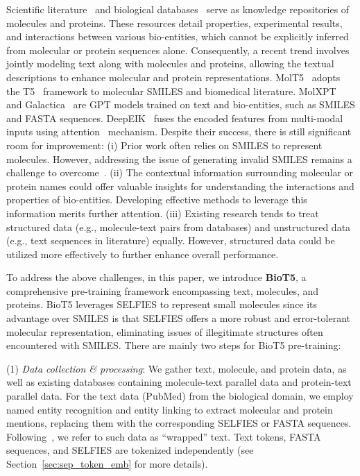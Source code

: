 \documentclass[11pt]{article}
\newcommand{\method}{{BioT5}}
\begin{document}
Scientific literature~\citep{DBLP:conf/emnlp/BeltagyLC19,canese2013pubmed} and biological databases~\citep{kim2023pubchem,boutet2007uniprotkb} serve as knowledge repositories of molecules and proteins.
These resources detail properties, experimental results, and interactions between various bio-entities, which cannot be explicitly inferred from molecular or protein sequences alone.
Consequently, a recent trend involves jointly modeling text along with molecules and proteins, allowing the textual descriptions to enhance molecular and protein representations. 
MolT5~\citep{DBLP:conf/emnlp/EdwardsLRHCJ22} adopts the T5~\citep{raffel2020exploring} framework to molecular SMILES and biomedical literature. 
MolXPT~\citep{liu2023molxpt} and Galactica~\citep{taylor2022galactica} are GPT models trained on text and bio-entities, such as SMILES and FASTA sequences.
DeepEIK~\citep{luo2023empowering} fuses the encoded features from multi-modal inputs using attention~\citep{vaswani2017attention} mechanism.
Despite their success, there is still significant room for improvement: (i) Prior work often relies on SMILES to represent molecules. However, addressing the issue of generating invalid SMILES remains a challenge to overcome~\citep{DBLP:conf/emnlp/EdwardsLRHCJ22,li2023empowering}.
(ii) The contextual information surrounding molecular or protein names could offer valuable insights for understanding the interactions and properties of bio-entities. Developing effective methods to leverage this information merits further attention. 
(iii) Existing research tends to treat structured data (e.g., molecule-text pairs from databases) and unstructured data (e.g., text sequences in literature) equally. However, structured data could be utilized more effectively to further enhance overall performance.

To address the above challenges, in this paper, we introduce \textbf{\method}, a comprehensive pre-training framework encompassing text, molecules, and proteins. \method{} leverages SELFIES \cite{krenn2020self}  to represent small molecules since its advantage over SMILES is that SELFIES offers a more robust and error-tolerant molecular representation, eliminating issues of illegitimate structures often encountered with SMILES. There are mainly two steps for \method{} pre-training:

(1) {\em Data collection \& processing}: We gather text, molecule, and protein data, as well as existing databases containing molecule-text parallel data and protein-text parallel data. For the text data (PubMed) from the biological domain, we employ named entity recognition and entity linking to extract molecular and protein mentions, replacing them with the corresponding SELFIES or FASTA sequences. Following~\citet{liu2023molxpt}, we refer to such data as ``wrapped'' text. Text tokens, FASTA sequences, and SELFIES are tokenized independently (see Section~\ref{sec:sep_token_emb} for more details).
\end{document}
